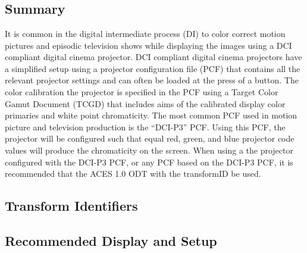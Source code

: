 \section[P3-DCI]{\shortName{}}
\label{sec:odt-details-\id}

\subsection{Summary}
\label{subsec:summary-\id}

It is common in the digital intermediate process (DI) to color correct motion pictures and episodic television shows while displaying the images using a DCI compliant digital cinema projector. DCI compliant digital cinema projectors have a simplified setup using a projector configuration file (PCF) that contains all the relevant projector settings and can often be loaded at the press of a button. The color calibration the projector is specified in the PCF using a Target Color Gamut Document (TCGD) that includes aims of the calibrated display color primaries and white point chromaticity.  The most common PCF used in motion picture and television production is the ``DCI-P3'' PCF. Using this PCF, the projector will be configured such that equal red, green, and blue projector code values will produce the chromaticity  on the screen. When using a the projector configured with the DCI-P3 PCF, or any PCF based on the DCI-P3 PCF, it is recommended that the ACES 1.0 ODT with the transformID \transformID{} be used.

\subsection{Transform Identifiers} 
\label{subsec:odt-ident-\id}

\subsection{Recommended Display and Setup}
\label{subsec:setup-\id}

